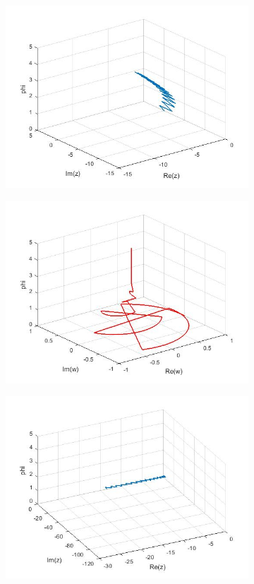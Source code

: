 \documentclass[a4paper,11pt]{article}
\begin{document}
\begin{figure}[!h]
\begin{subfigure}[c]{0.5\textwidth}
\includegraphics[width=\linewidth]{23.jpg}
\end{subfigure}
\begin{subfigure}[c]{0.5\textwidth}
\includegraphics[width=\linewidth]{24.jpg}
\end{subfigure}
\begin{subfigure}[c]{0.5\textwidth}
\includegraphics[width=\linewidth]{29.jpg}

\end{subfigure}
\end{figure}
\end{document}
